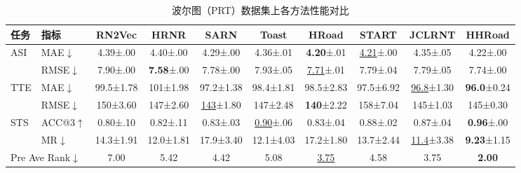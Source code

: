 \begin{table}[H]
    \centering
    \caption{波尔图（PRT）数据集上各方法性能对比}
    \label{tab:HHRoad_prt}
    \small
    \setlength{\tabcolsep}{4pt}
    \renewcommand{\arraystretch}{1.2}
    \begin{tabular}{llcccccccc}
        \toprule
        \textbf{任务} & \textbf{指标}
            & \textbf{RN2Vec} & \textbf{HRNR} & \textbf{SARN}
            & \textbf{Toast} & \textbf{HRoad} & \textbf{START}
            & \textbf{JCLRNT} & \textbf{HHRoad} \\
        \midrule
        \multirow{2}{*}{ASI}
            & MAE$\downarrow$
            & 4.39\tiny{±.00} & 4.40\tiny{±.00} & 4.29\tiny{±.00}
            & 4.36\tiny{±.01} & \textbf{4.20}\tiny{±.01} & \underline{4.21}\tiny{±.00}
            & 4.35\tiny{±.05} & 4.22\tiny{±.00} \\
            & RMSE$\downarrow$
            & 7.90\tiny{±.00} & \textbf{7.58}\tiny{±.00} & 7.78\tiny{±.00}
            & 7.93\tiny{±.05} & \underline{7.71}\tiny{±.01} & 7.79\tiny{±.04}
            & 7.79\tiny{±.05} & 7.74\tiny{±.00} \\
        \cmidrule(lr){1-10}
        \multirow{2}{*}{TTE}
            & MAE$\downarrow$
            & 99.5\tiny{±1.78} & 101\tiny{±1.98} & 97.2\tiny{±1.38}
            & 98.4\tiny{±1.81} & 98.5\tiny{±2.83} & 97.5\tiny{±6.92}
            & \underline{96.8}\tiny{±1.30} & \textbf{96.0}\tiny{±0.24} \\
            & RMSE$\downarrow$
            & 150\tiny{±3.60} & 147\tiny{±2.60} & \underline{143}\tiny{±1.80}
            & 147\tiny{±2.48} & \textbf{140}\tiny{±2.22} & 158\tiny{±7.04}
            & 145\tiny{±1.03} & 145\tiny{±0.30} \\
        \cmidrule(lr){1-10}
        \multirow{2}{*}{STS}
            & ACC@3$\uparrow$
            & 0.80\tiny{±.10} & 0.82\tiny{±.11} & 0.83\tiny{±.03}
            & \underline{0.90}\tiny{±.06} & 0.83\tiny{±.04} & 0.88\tiny{±.02}
            & 0.87\tiny{±.04} & \textbf{0.96}\tiny{±.00} \\
            & MR$\downarrow$
            & 14.3\tiny{±1.91} & 12.0\tiny{±1.81} & 17.9\tiny{±3.40}
            & 12.1\tiny{±4.03} & 17.2\tiny{±1.80} & 13.7\tiny{±2.44}
            & \underline{11.4}\tiny{±3.38} & \textbf{9.23}\tiny{±1.15} \\
        \midrule
        \multicolumn{2}{l}{Pre Ave Rank$\downarrow$}
            & 7.00 & 5.42 & 4.42 & 5.08 & \underline{3.75} & 4.58 & 3.75 & \textbf{2.00} \\
        \bottomrule
    \end{tabular}
\end{table}

